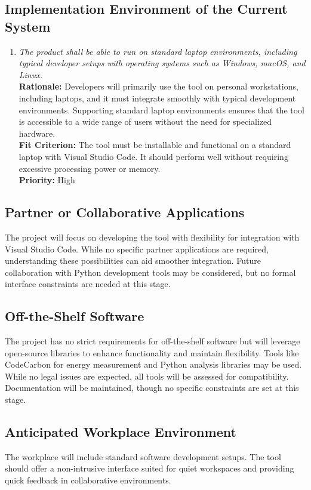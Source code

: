 \documentclass[12pt]{article}
\begin{document}
\subsection{Implementation Environment of the Current System}
\begin{enumerate}[label=MD-EC \arabic*., wide=0pt, leftmargin=*]
  \item \emph{The product shall be able to run on standard laptop
      environments, including typical developer setups with operating
    systems such as Windows, macOS, and Linux.}\\[2mm]
    {\bf Rationale:} Developers will primarily use the tool on
    personal workstations, including laptops, and it must integrate
    smoothly with typical development environments. Supporting
    standard laptop environments ensures that the tool is accessible
    to a wide range of users without the need for specialized hardware.\\
    {\bf Fit Criterion:} The tool must be installable and functional
    on a standard laptop with Visual Studio Code. It should perform
    well without requiring excessive processing power or memory.\\
    {\bf Priority:} High
\end{enumerate}
\subsection{Partner or Collaborative Applications}
The project will focus on developing the tool with flexibility for
integration with Visual Studio Code. While no specific partner
applications are required, understanding these possibilities can aid
smoother integration. Future collaboration with Python development
tools may be considered, but no formal interface constraints are
needed at this stage.
\subsection{Off-the-Shelf Software}
The project has no strict requirements for off-the-shelf software but
will leverage open-source libraries to enhance functionality and
maintain flexibility. Tools like CodeCarbon for energy measurement
and Python analysis libraries may be used. While no legal issues are
expected, all tools will be assessed for compatibility. Documentation
will be maintained, though no specific constraints are set at this stage.
\subsection{Anticipated Workplace Environment}
The workplace will include standard software development setups. The
tool should offer a non-intrusive interface suited for quiet
workspaces and providing quick feedback in collaborative environments.
\end{document}
